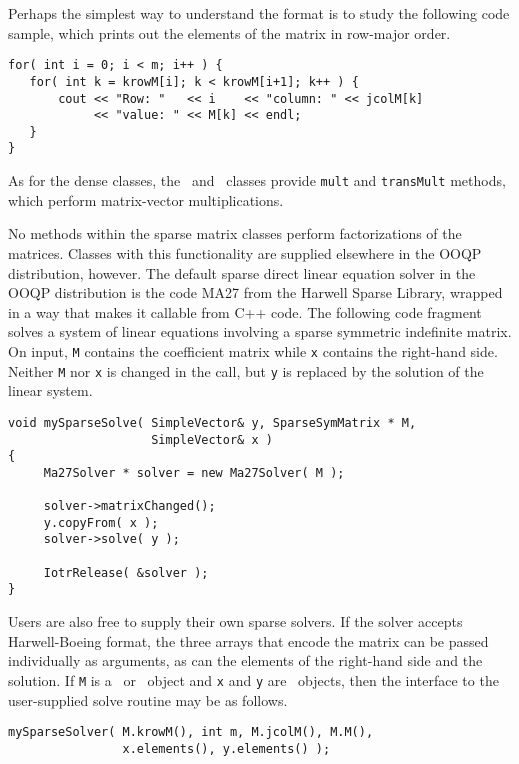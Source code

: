 Perhaps the simplest way to understand the format is to study the
following code sample, which prints out the elements of the matrix in
row-major order.
\begin{verbatim}
for( int i = 0; i < m; i++ ) {
   for( int k = krowM[i]; k < krowM[i+1]; k++ ) {
       cout << "Row: "   << i    << "column: " << jcolM[k]
            << "value: " << M[k] << endl;
   }
}
\end{verbatim}

As for the dense classes, the \SparseGenMatrix\ and \SparseSymMatrix\
classes provide \texttt{mult} and \texttt{transMult} methods, which
perform matrix-vector multiplications. 

No methods within the sparse matrix classes perform factorizations of
the matrices. Classes with this functionality are supplied elsewhere
in the OOQP distribution, however. The default sparse direct linear
equation solver in the OOQP distribution is the code MA27 from the
Harwell Sparse Library, wrapped in a way that makes it callable from
C++ code. The following code fragment solves a system of linear
equations involving a sparse symmetric indefinite matrix. On input,
\texttt{M} contains the coefficient matrix while \texttt{x} contains
the right-hand side. Neither \texttt{M} nor \texttt{x} is changed in
the call, but \texttt{y} is replaced by the solution of the linear
system.
\begin{verbatim}
void mySparseSolve( SimpleVector& y, SparseSymMatrix * M,
                    SimpleVector& x )
{
     Ma27Solver * solver = new Ma27Solver( M );

     solver->matrixChanged();
     y.copyFrom( x );
     solver->solve( y );

     IotrRelease( &solver );
}
\end{verbatim}

Users are also free to supply their own sparse solvers. If the
solver accepts Harwell-Boeing format, the three arrays that encode the
matrix can be passed individually as arguments, as can the elements of
the right-hand side and the solution. If \texttt{M} is a
\SparseGenMatrix\ or \SparseSymMatrix\ object and \texttt{x} and
\texttt{y} are \SimpleVector\ objects, then the interface to the
user-supplied solve routine may be as follows.
\begin{verbatim}
mySparseSolver( M.krowM(), int m, M.jcolM(), M.M(), 
                x.elements(), y.elements() );
\end{verbatim}

